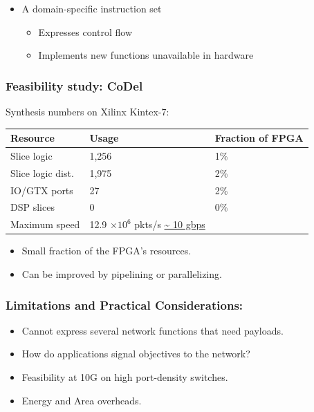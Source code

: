 \begin{Large}
\begin{frame}[plain]
\begin{itemize}
\item A domain-specific instruction set
      \begin{itemize}
      \item Expresses control flow
      \item Implements new functions unavailable in hardware
      \end{itemize}
\end{itemize}
\end{frame}

\begin{frame}[plain]
\frametitle{Feasibility study: CoDel}
\begin{center}
Synthesis numbers on Xilinx Kintex-7: \\
\begin{tabular}{lll}
\bf Resource & \bf Usage & \bf Fraction of FPGA \\
\hline Slice logic & 1,256 & 1\% \\
Slice logic dist. & 1,975 & 2\% \\
IO/GTX ports & 27 & 2\% \\
DSP slices & 0 & 0\% \\
Maximum speed & 12.9 $\times 10^6$ pkts/s \url{~ 10 gbps} \\
\end{tabular}
\end{center}
\begin{itemize}
\item Small fraction of the FPGA's resources.
\item Can be improved by pipelining or parallelizing.
\end{itemize}
\end{frame}

\begin{frame}[plain]
\frametitle{Limitations and Practical Considerations:}
\begin{itemize}
\item Cannot express several network functions that need payloads.
\item How do applications signal objectives to the network?
\item Feasibility at 10G on high port-density  switches.
\item Energy and Area overheads.
\end{itemize}
\end{frame}


\end{Large}
